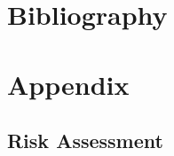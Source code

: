 \documentclass[12pt]{article}
\begin{document}
    \newpage

\section{Bibliography}
    
\section{Appendix}
    \subsection{Risk Assessment}
        
    
\end{document}
